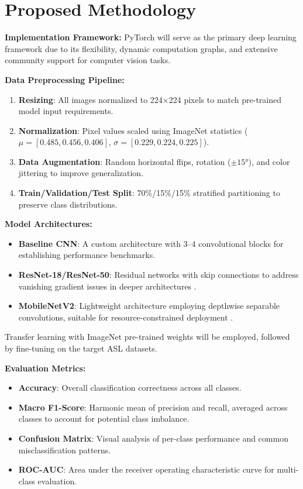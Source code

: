 \documentclass[11pt,a4paper]{article}
\begin{document}
\section{Proposed Methodology}

\textbf{Implementation Framework:} PyTorch will serve as the primary deep learning framework due to its flexibility, dynamic computation graphs, and extensive community support for computer vision tasks.

\textbf{Data Preprocessing Pipeline:}
\begin{enumerate}[noitemsep,topsep=2pt]
    \item \textbf{Resizing}: All images normalized to 224$\times$224 pixels to match pre-trained model input requirements.
    \item \textbf{Normalization}: Pixel values scaled using ImageNet statistics ($\mu = [0.485, 0.456, 0.406]$, $\sigma = [0.229, 0.224, 0.225]$).
    \item \textbf{Data Augmentation}: Random horizontal flips, rotation ($\pm15°$), and color jittering to improve generalization.
    \item \textbf{Train/Validation/Test Split}: 70\%/15\%/15\% stratified partitioning to preserve class distributions.
\end{enumerate}

\textbf{Model Architectures:}
\begin{itemize}[noitemsep,topsep=2pt]
    \item \textbf{Baseline CNN}: A custom architecture with 3--4 convolutional blocks for establishing performance benchmarks.
    \item \textbf{ResNet-18/ResNet-50}: Residual networks with skip connections to address vanishing gradient issues in deeper architectures \cite{he2016resnet}.
    \item \textbf{MobileNetV2}: Lightweight architecture employing depthwise separable convolutions, suitable for resource-constrained deployment \cite{sandler2018mobilenetv2}.
\end{itemize}

Transfer learning with ImageNet pre-trained weights will be employed, followed by fine-tuning on the target ASL datasets.

\textbf{Evaluation Metrics:}
\begin{itemize}[noitemsep,topsep=2pt]
    \item \textbf{Accuracy}: Overall classification correctness across all classes.
    \item \textbf{Macro F1-Score}: Harmonic mean of precision and recall, averaged across classes to account for potential class imbalance.
    \item \textbf{Confusion Matrix}: Visual analysis of per-class performance and common misclassification patterns.
    \item \textbf{ROC-AUC}: Area under the receiver operating characteristic curve for multi-class evaluation.
\end{itemize}
\end{document}
